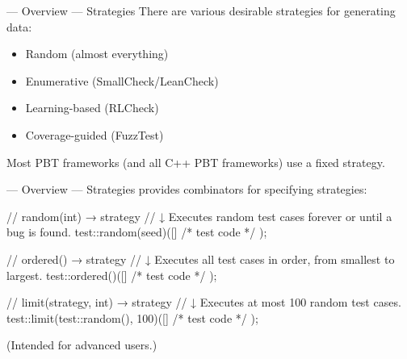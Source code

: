 
\begin{frame}{\halcheck{} --- Overview --- Strategies}
  There are various desirable strategies for generating data:
  \begin{itemize}
    \item Random (almost everything)
    \item Enumerative (SmallCheck/LeanCheck) \pause{}
    \item Learning-based (RLCheck)
    \item Coverage-guided (FuzzTest) \pause{}
  \end{itemize}

  Most PBT frameworks (and all C++ PBT frameworks) use a \alert{fixed strategy}.
\end{frame}

\begin{frame}[fragile]{\halcheck{} --- Overview --- Strategies}
  \halcheck{} provides combinators for specifying strategies:

  \begin{cppcode}
    //   random(int) → strategy
    // ↓ Executes random test cases forever or until a bug is found.
    test::random(seed)([] { /* test code */ });
  \end{cppcode}

  \pause{}

  \begin{cppcode}
    //   ordered() → strategy
    // ↓ Executes all test cases in order, from smallest to largest.
    test::ordered()([] { /* test code */ });
  \end{cppcode}

  \pause{}

  \begin{cppcode}
    //   limit(strategy, int) → strategy
    // ↓ Executes at most 100 random test cases.
    test::limit(test::random(), 100)([] { /* test code */ });
  \end{cppcode}

  \pause{}

  (Intended for advanced users.)
\end{frame}


